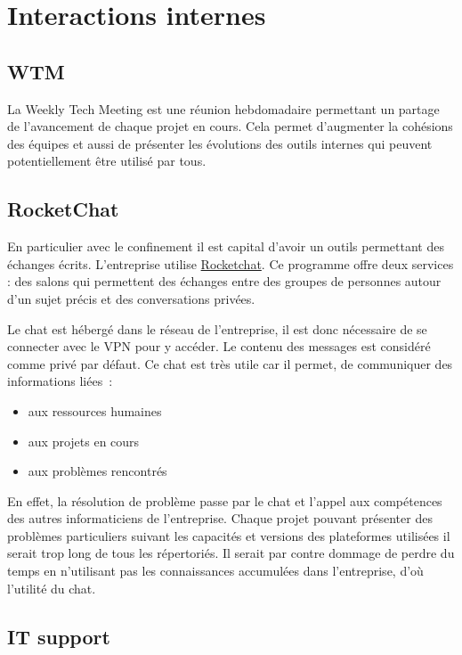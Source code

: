 \documentclass[french,a4paper,12pt]{report}
\begin{document}
\section{Interactions internes}

\subsection{WTM}

La Weekly Tech Meeting est une réunion hebdomadaire permettant un partage de l’avancement de chaque projet en cours. Cela permet d'augmenter la cohésions des équipes et aussi de présenter les évolutions des outils internes qui peuvent potentiellement être utilisé par tous.

\subsection{RocketChat}

En particulier avec le confinement il est capital d’avoir un outils permettant des échanges écrits. L'entreprise utilise \href{https://rocket.chat/}{Rocketchat}. Ce programme offre deux services : des salons qui permettent des échanges entre des groupes de personnes autour d'un sujet précis et des conversations privées.

Le chat est hébergé dans le réseau de l’entreprise, il est donc nécessaire de se connecter avec le VPN pour y accéder. Le contenu des messages est considéré comme privé par défaut.
Ce chat est très utile car il permet, de communiquer des informations liées :

\begin{itemize}
\setcounter{enumi}{-1}
\item aux ressources humaines
\item aux projets en cours
\item aux problèmes rencontrés
\end{itemize}

En effet, la résolution de problème passe par le chat et l'appel aux compétences des autres informaticiens de l’entreprise. Chaque projet pouvant présenter des problèmes particuliers suivant les capacités et versions des plateformes utilisées il serait trop long de tous les répertoriés. Il serait par contre dommage de perdre du temps en n’utilisant pas les connaissances accumulées dans l’entreprise, d'où l'utilité du chat. 

\subsection{IT support}
\end{document}
